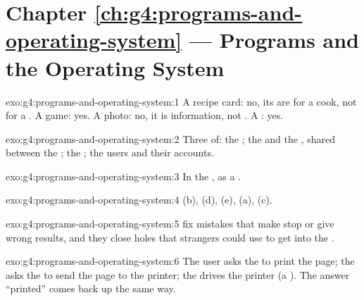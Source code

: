 \section*{Chapter \ref{ch:g4:programs-and-operating-system} --- Programs and the Operating System}

\begin{solution}{exo:g4:programs-and-operating-system:1}
A recipe card: no, its  are for a cook, not for a . A game:
yes. A photo: no, it is information, not . A : yes.
\end{solution}

\begin{solution}{exo:g4:programs-and-operating-system:2}
Three of: the ; the  and the , shared between the
; the ; the users and their accounts.
\end{solution}

\begin{solution}{exo:g4:programs-and-operating-system:3}
In the , as a .
\end{solution}

\begin{solution}{exo:g4:programs-and-operating-system:4}
(b), (d), (e), (a), (c).
\end{solution}

\begin{solution}{exo:g4:programs-and-operating-system:5}
 fix mistakes that make  stop or give wrong results, and they
close holes that strangers could use to get into the .
\end{solution}

\begin{solution}{exo:g4:programs-and-operating-system:6}
The user asks the  to print the page; the  asks the
 to send the page to the printer; the  drives
the printer (a ). The answer ``printed'' comes back up the same way.
\end{solution}


